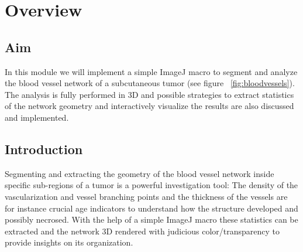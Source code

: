 \setcounter{section}{-1}
%
\section{Overview}
\subsection{Aim}
%
In this module we will implement a simple ImageJ macro to segment and analyze the blood vessel network of a subcutaneous tumor (see figure ~\ref{fig:bloodvessels}). The analysis is fully performed in 3D and possible strategies to extract statistics of the network geometry and interactively visualize the results are also discussed and implemented.
%
\subsection{Introduction}
\label{sec:mod8lab0}
%
Segmenting and extracting the geometry of the blood vessel network inside specific sub-regions of a tumor is a powerful investigation tool: The density of the vascularization and vessel branching points and the thickness of the vessels are for instance crucial age indicators to understand how the structure developed and possibly necrosed. With the help of a simple ImageJ macro these statistics can be extracted and the network 3D rendered with judicious color/transparency to provide insights on its organization.
%

